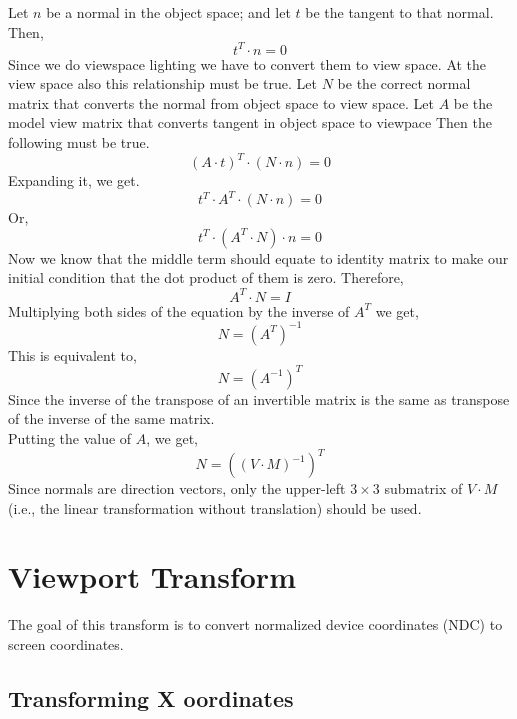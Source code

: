 Let $n$ be a normal in the object space; and let $t$ be the tangent to that normal. Then, 
\[
t^T \cdot n = 0
\]
Since we do viewspace lighting we have to convert them to view space. At the view space also this relationship must be true. Let $N$ be the correct normal matrix that converts the normal from object space to view space. Let $A$ be the model view matrix that converts tangent in object space to viewpace
Then the following must be true.
\[
(A  \cdot t )^T \cdot (N  \cdot n) = 0
\]
Expanding it, we get.
\[
t^T \cdot A^T \cdot (N \cdot n) = 0
\]
Or,
\[
t^T \cdot (A^T \cdot N) \cdot n = 0
\]
Now we know that the middle term should equate to identity matrix to make our initial condition that the dot product of them is zero. 
Therefore, 
\[
A^T \cdot N = I
\]
Multiplying both sides of the equation by the inverse of $A^T$ we get,
\[
N = (A^T)^{-1}
\]
This is equivalent to,
\[
N = (A^{-1})^T
\]
Since the inverse of the transpose of an invertible matrix is the same as transpose of the inverse of the same matrix.\\
Putting the value of $A$, we get,
\begin{equation}
N = ((V \cdot M)^{-1})^T
\end{equation}
Since normals are direction vectors, only the upper-left \( 3 \times 3 \) submatrix of \( V \cdot M \) (i.e., the linear transformation without translation) should be used.

\section{Viewport Transform}
The goal of this transform is to convert normalized device coordinates (NDC) to screen coordinates. 
\subsection{Transforming X oordinates}


